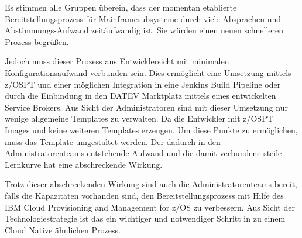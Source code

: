 Es stimmen alle Gruppen überein, dass der momentan etablierte Bereitstellungsprozess für Mainframesubsysteme durch viele Absprachen und Abstimmungs-Aufwand zeitäufwandig ist.
Sie würden einen neuen schnelleren Prozess begrüßen.

Jedoch muss dieser Prozess aus Entwicklersicht mit minimalen Konfigurationsaufwand verbunden sein.
Dies ermöglicht eine Umsetzung mittels z/OSPT und einer möglichen Integration in eine Jenkins Build Pipeline oder durch die Einbindung in den \glqq DATEV Marktplatz\grqq{} mittels eines entwickelten \glqq Service Brokers\grqq.
Aus Sicht der Administratoren sind mit dieser Umsetzung nur wenige allgemeine Templates zu verwalten.
Da die Entwickler mit z/OSPT Images und keine weiteren Templates erzeugen.
Um diese Punkte zu ermöglichen, muss das Template umgestaltet werden.
Der dadurch in den Administratorenteams entstehende Aufwand und die damit verbundene steile Lernkurve hat eine abschreckende Wirkung.

Trotz dieser abschreckenden Wirkung sind auch die Administratorenteams bereit, falls die Kapazitäten vorhanden sind, den Bereitstellungsprozess mit Hilfe des \glqq IBM Cloud Provisioning and Management for z/OS\grqq{} zu verbessern.
Aus Sicht der Technologiestrategie ist das ein wichtiger und notwendiger Schritt in zu einem Cloud Native ähnlichen Prozess.